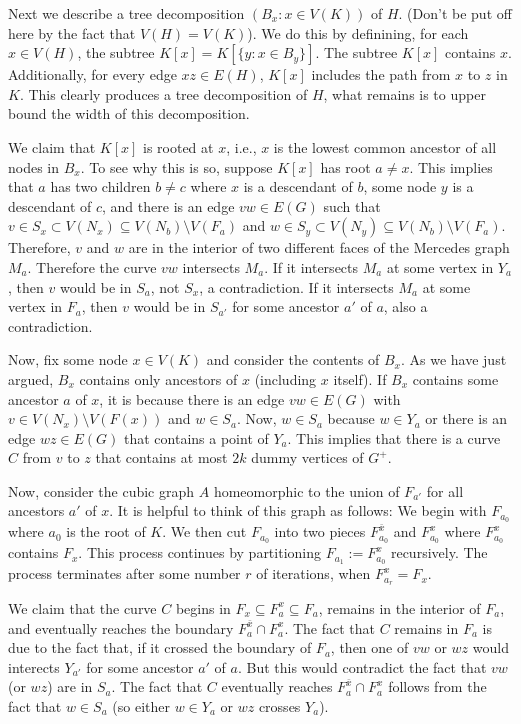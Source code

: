 \documentclass{patmorin}
\begin{document}
Next we describe a tree decomposition $(B_x:x\in V(K))$ of $H$.  (Don't be put off here by the fact that $V(H)=V(K)$).  We do this by definining, for each $x\in V(H)$, the subtree $K[x]=K[\{y:x\in B_y\}]$.  The subtree $K[x]$ contains $x$.  Additionally, for every edge $xz\in E(H)$, $K[x]$ includes the path from $x$ to $z$ in $K$.  This clearly produces a tree decomposition of $H$, what remains is to upper bound the width of this decomposition.

We claim that $K[x]$ is rooted at $x$, i.e., $x$ is the lowest common ancestor of all nodes in $B_x$.  To see why this is so, suppose $K[x]$ has root $a\neq x$.  This implies that $a$ has two children $b\neq c$ where $x$ is a descendant of $b$, some node $y$ is a descendant of $c$, and there is an edge $vw\in E(G)$ such that $v\in S_x\subset V(N_x)\subseteq V(N_b)\setminus V(F_a)$
and $w\in S_y\subset V(N_y)\subseteq V(N_b)\setminus V(F_a)$.  Therefore, $v$ and $w$ are in the interior of two different faces of the Mercedes graph $M_a$.  Therefore the curve $vw$ intersects $M_a$.  If it intersects $M_a$ at some vertex in $Y_a$, then $v$ would be in $S_a$, not $S_x$, a contradiction.  If it intersects $M_a$ at some vertex in $F_a$, then $v$ would be in $S_{a'}$ for some ancestor $a'$ of $a$, also a contradiction.

Now, fix some node $x\in V(K)$ and consider the contents of $B_x$.  As we have just argued, $B_x$ contains only ancestors of $x$ (including $x$ itself). If $B_x$ contains some ancestor $a$ of $x$, it is because there is an edge $vw\in E(G)$ with $v\in V(N_x)\setminus V(F(x))$ and $w\in S_a$.  Now, $w\in S_a$ because $w\in Y_a$ or there is an edge $wz\in E(G)$ that contains a point of $Y_a$.  This implies that there is a curve $C$ from $v$ to $z$ that contains at most $2k$ dummy  vertices of $G^+$.

Now, consider the cubic graph $A$ homeomorphic to the union of $F_{a'}$ for all ancestors $a'$ of $x$.  It is helpful to think of this graph as follows:  We begin with $F_{a_0}$ where $a_0$ is the root of $K$.  We then cut $F_{a_0}$ into two pieces $F^{\bar{x}}_{a_0}$ and $F^x_{a_0}$ where $F^x_{a_0}$ contains $F_x$.  This process continues by partitioning $F_{a_1}:=F^x_{a_0}$ recursively.  The process terminates after some number $r$ of iterations, when $F^x_{a_r}=F_x$.

We claim that the curve $C$ begins in $F_x\subseteq F^x_a\subseteq F_a$, remains in the interior of $F_a$, and eventually reaches the boundary $F^{\bar{x}}_a\cap F^x_a$.  The fact that $C$ remains in $F_a$ is due to the fact that, if it crossed the boundary of $F_a$, then one of $vw$ or $wz$ would interects $Y_{a'}$ for some ancestor $a'$ of $a$.  But this would contradict the fact that $vw$ (or $wz$) are in $S_a$. The fact that $C$ eventually reaches $F^{\bar{x}}_a\cap F^x_a$ follows from the fact that $w\in S_a$ (so either $w\in Y_a$ or $wz$ crosses $Y_a$). 
\end{document}
